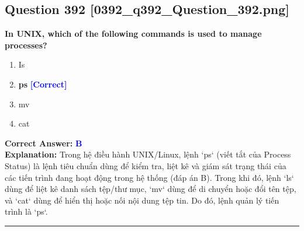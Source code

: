 \documentclass[11pt,a4paper]{article}
\begin{document}
\begin{minipage}{\textwidth}
\subsection*{Question 392 \quad \footnotesize{[0392\_q392\_Question\_392.png]}}
\noindent \textbf{In UNIX, which of the following commands is used to manage processes?}

\begin{enumerate}[label=\Alph*.]
    \item Is
    \item \textbf{ps} \hfill \textcolor{blue}{\textbf{[Correct]}}
    \item mv
    \item cat
\end{enumerate}

\noindent \textbf{Correct Answer:} \textcolor{blue}{\textbf{B}} \\[2pt]
\noindent \textbf{Explanation:} Trong hệ điều hành UNIX/Linux, lệnh `ps` (viết tắt của Process Status) là lệnh tiêu chuẩn dùng để kiểm tra, liệt kê và giám sát trạng thái của các tiến trình đang hoạt động trong hệ thống (đáp án B). Trong khi đó, lệnh `ls` dùng để liệt kê danh sách tệp/thư mục, `mv` dùng để di chuyển hoặc đổi tên tệp, và `cat` dùng để hiển thị hoặc nối nội dung tệp tin. Do đó, lệnh quản lý tiến trình là `ps`.

\par\vspace{0.3cm}
\hrule
\vspace{0.3cm}
\end{minipage}
\end{document}

